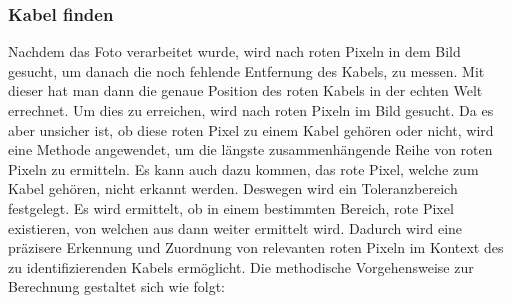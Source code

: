\subsubsection{Kabel finden}
Nachdem das Foto verarbeitet wurde, wird nach roten Pixeln in dem Bild gesucht, um danach die noch fehlende Entfernung des Kabels, zu messen. Mit dieser hat man dann die genaue Position des roten Kabels in der echten Welt errechnet. Um dies zu erreichen, wird nach roten Pixeln im Bild gesucht. Da es aber unsicher ist, ob diese roten Pixel zu einem Kabel gehören oder nicht, wird eine Methode angewendet, um die längste zusammenhängende Reihe von roten Pixeln zu ermitteln. Es kann auch dazu kommen, das rote Pixel, welche zum Kabel gehören, nicht erkannt werden. Deswegen wird ein Toleranzbereich festgelegt. Es wird ermittelt, ob in einem bestimmten Bereich, rote Pixel existieren, von welchen aus dann weiter ermittelt wird. Dadurch wird eine präzisere Erkennung und Zuordnung von relevanten roten Pixeln im Kontext des zu identifizierenden Kabels ermöglicht. Die methodische Vorgehensweise zur Berechnung gestaltet sich wie folgt:

